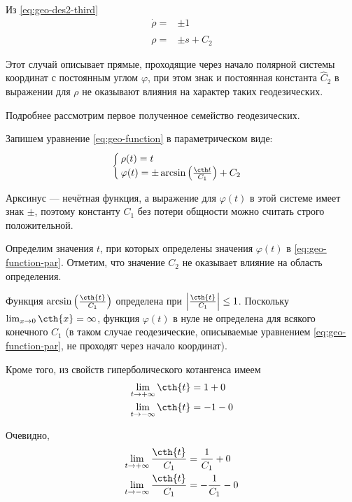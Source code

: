 \documentclass{article}
\numberwithin{equation}{section}
\renewcommand{\phi}{\varphi}
\providecommand{\abs}[1]{\left \lvert{#1}\right \rvert}
\begin{document}
\begin{enumerate}
  Из \eqref{eq:geo-des2-third}
  \begin{equation*}
    \begin{split}
      \dot{\rho} =& \pm 1\\
      \rho =& \pm s + \hat{C}_2
    \end{split}
  \end{equation*}
  
  Этот случай описывает прямые, проходящие через начало полярной системы
  координат с постоянным углом $\phi$, при этом знак и постоянная
  константа $\hat{C}_2$ в выражении для $\rho$ не оказывают влияния на
  характер таких геодезических.
\end{enumerate}

Подробнее рассмотрим первое полученное семейство геодезических.

Запишем уравнение \eqref{eq:geo-function} в параметрическом виде:
\begin{equation}\label{eq:geo-function-par}
  \begin{cases}
    \rho(t) = t \\
    \phi(t) = \pm \arcsin\left(\frac{\cth t}{C_1}\right) + C_2
  \end{cases}
\end{equation}

Арксинус — нечётная функция, а выражение для $\phi(t)$ в этой системе
имеет знак $\pm$, поэтому константу $C_1$ без потери
общности можно считать строго положительной.

Определим значения $t$, при которых определены значения $\phi(t)$ в
\eqref{eq:geo-function-par}. Отметим, что значение $C_2$ не оказывает
влияние на область определения.

Функция $\arcsin{\left(\frac{\cth{t}}{C_1}\right)}$ определена при
$\abs{\frac{\cth{t}}{C_1}} \leq 1$. Поскольку \mbox{$\lim_{x \to
    0}{\cth{x}} = \infty$}, функция $\phi(t)$ в нуле не определена для
всякого конечного $C_1$ (в таком случае геодезические, описываемые
уравнением \eqref{eq:geo-function-par}, не проходят через начало
координат).

Кроме того, из свойств гиперболического котангенса имеем
\begin{align*}
  \lim_{t \to +\infty}{\cth{t}} &= 1 + 0 \\
  \lim_{t \to -\infty}{\cth{t}} &= -1 - 0 \\
\end{align*}



Очевидно,
\begin{align*}
  \lim_{t \to +\infty}{\frac{\cth{t}}{C_1}} &= \frac{1}{C_1} + 0 \\
  \lim_{t \to -\infty}{\frac{\cth{t}}{C_1}} &= -\frac{1}{C_1} - 0 \\
\end{align*}
\end{document}
